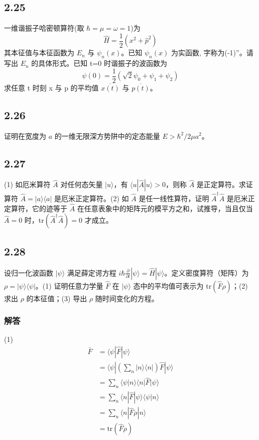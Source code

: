 \subsection{2.25}
一维谐振子哈密顿算符(取 $\hbar = \mu = \omega = 1$)为
$$\hat{H} = \frac{1}{2}(x^2 + \hat{p}^2)$$
其本征值与本征函数为 $E_n$ 与 $\psi_n(x)$。已知 $\psi_n(x)$ 为实函数, 字称为(-1)”。请写出 $E_n$ 的具体形式。已知 t=0 时谐振子的波函数为
$$\psi(0) = \frac{1}{2} \left( \sqrt{2}\psi_0 + \psi_1 + \psi_2 \right)$$
求任意 t 时刻 x 与 p 的平均值 $\overline{x(t)}$ 与 $\overline{p(t)}$。

\subsection{2.26}
证明在宽度为 $a$ 的一维无限深方势阱中的定态能量 $E > \hbar^2 / 2 \mu a^2$。

\subsection{2.27}
(1) 如厄米算符 $\hat{A}$ 对任何态矢量 $|u\rangle$，有 $\langle u|\hat{A}|u\rangle > 0$，则称 $\hat{A}$ 是正定算符。求证算符 $\hat{A} = |a\rangle \langle a|$ 是厄米正定算符。(2) 如 $\hat{A}$ 是任一线性算符，证明 $\hat{A}^{\dagger} \hat{A}$ 是厄米正定算符，它的迹等于 $\hat{A}$ 在任意表象中的矩阵元的模平方之和，试推导，当且仅当 $\hat{A} = 0$ 时，tr$(\hat{A}^{\dagger} \hat{A}) = 0$ 才成立。

\newpage
\subsection{2.28}
设归一化波函数 $|\psi\rangle$ 满足薛定谔方程 $i \hbar \frac{\partial}{\partial t} |\psi\rangle = \hat{H} |\psi\rangle$。定义密度算符（矩阵）为 $\rho = |\psi\rangle \langle \psi|$。(1) 证明任意力学量 $\hat{F}$ 在 $|\psi\rangle$ 态中的平均值可表示为 tr$(\hat{F}\rho)$；(2) 求出 $\rho$ 的本征值；(3) 导出 $\rho$ 随时间变化的方程。

\subsubsection{解答}
(1)
\begin{equation}
    \begin{aligned}
        \bar{F}&=\langle \psi |\hat{F}|\psi \rangle 
\\
&=\langle \psi |\left( \sum_n{|n\rangle \langle n|} \right) \hat{F}|\psi \rangle 
\\
&=\sum_n{\langle \psi |n\rangle \langle n|\hat{F}|\psi \rangle}
\\
&=\sum_n{\langle n|\hat{F}|\psi \rangle \langle \psi |n\rangle}
\\
&=\sum_n{\langle n|\hat{F}\rho |n\rangle}
\\
&=\mathrm{tr}\left( \hat{F}\rho \right) 
    \end{aligned}
\end{equation}


